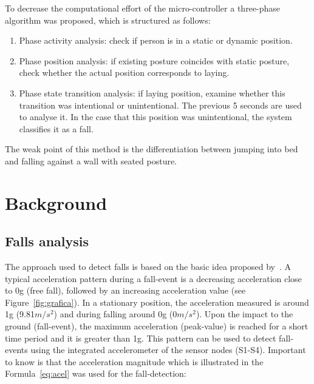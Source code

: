 \documentclass[conference]{IEEEtran}
\theoremstyle{definition}
\begin{document}
To decrease the computational effort of the micro-controller a three-phase algorithm was proposed, which is structured 
as follows:

\begin{enumerate}
 \item Phase activity analysis: check if person is in a static or dynamic position.
 \item Phase position analysis: if existing posture coincides with static posture, check whether the actual position corresponds to laying.
 \item Phase state transition analysis: if laying position, examine whether this transition was intentional or unintentional. The previous 5 
 seconds are used to analyse it. In the case that this position was unintentional, the system classifies it as a fall. 
\end{enumerate}

The weak point of this method is the differentiation between jumping into bed and falling against a wall with seated posture.

\section{Background}
\label{sec:background}

\subsection{Falls analysis}
\label{subsec:analysis}

The approach used to detect falls is based on the basic idea proposed by~\cite{Gjoreski2014,Kozina}. A typical acceleration pattern during 
a fall-event is a decreasing acceleration close to 0g (free fall), followed by an increasing acceleration value (see Figure~\ref{fig:grafica}). In a stationary position, 
the acceleration measured is around 1g (9.81$m/s^{2}$) and during falling around 0g (0$m/s^{2}$). Upon the impact to the ground (fall-event), 
the maximum acceleration (peak-value) is reached for a short time period and it is greater than 1g. This pattern can be used to 
detect fall-events using the integrated accelerometer of the sensor nodes (S1-S4). Important to know is that the acceleration 
magnitude which is illustrated in the Formula~\ref{eq:acel} was used for the fall-detection:
\end{document}
